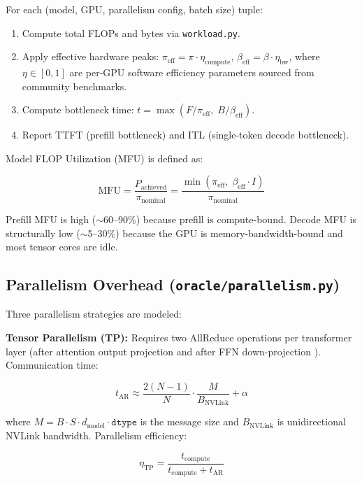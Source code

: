 \documentclass[11pt, letterpaper]{article}
\begin{document}
For each (model, GPU, parallelism config, batch size) tuple:

\begin{enumerate}[noitemsep]
  \item Compute total FLOPs and bytes via \texttt{workload.py}.
  \item Apply effective hardware peaks: $\pi_\text{eff} = \pi \cdot \eta_\text{compute}$,
    $\beta_\text{eff} = \beta \cdot \eta_\text{bw}$, where $\eta \in [0,1]$
    are per-GPU software efficiency parameters sourced from community benchmarks.
  \item Compute bottleneck time: $t = \max(F / \pi_\text{eff},\; B / \beta_\text{eff})$.
  \item Report TTFT (prefill bottleneck) and ITL (single-token decode bottleneck).
\end{enumerate}

Model FLOP Utilization (MFU) is defined as:

\begin{equation}
  \text{MFU} = \frac{P_\text{achieved}}{\pi_\text{nominal}}
    = \frac{\min(\pi_\text{eff},\; \beta_\text{eff} \cdot I)}{\pi_\text{nominal}}
\end{equation}

Prefill MFU is high ($\sim$60--90\%) because prefill is compute-bound.
Decode MFU is structurally low ($\sim$5--30\%) because the GPU is
memory-bandwidth-bound and most tensor cores are idle.

\subsection{Parallelism Overhead (\texttt{oracle/parallelism.py})}

Three parallelism strategies are modeled:

\textbf{Tensor Parallelism (TP):} Requires two AllReduce operations per
transformer layer (after attention output projection and after FFN
down-projection \cite{narayanan2021efficient}). Communication time:

\begin{equation}
  t_\text{AR} \approx \frac{2(N-1)}{N} \cdot \frac{M}{B_\text{NVLink}} + \alpha
  \label{eq:allreduce}
\end{equation}

where $M = B \cdot S \cdot d_\text{model} \cdot \texttt{dtype}$ is the
message size and $B_\text{NVLink}$ is unidirectional NVLink bandwidth.
Parallelism efficiency:

\begin{equation}
  \eta_\text{TP} = \frac{t_\text{compute}}{t_\text{compute} + t_\text{AR}}
\end{equation}
\end{document}
